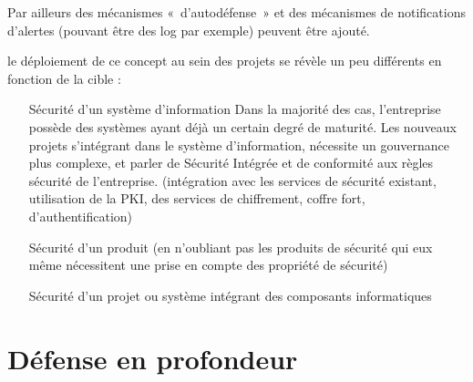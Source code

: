 Par ailleurs des mécanismes « d’autodéfense » et des mécanismes de notifications d’alertes (pouvant être des log par exemple) peuvent être ajouté.

le déploiement de ce concept au sein des projets  se révèle un peu différents en fonction de la cible :

\begin{itemize}
	\item  [Sécurité d’un système d’information] Dans la majorité des cas, l’entreprise possède des systèmes ayant déjà un certain degré de maturité. Les nouveaux projets s’intégrant dans le système d’information, nécessite un gouvernance plus complexe, et parler de Sécurité Intégrée et de conformité aux règles sécurité de l’entreprise. (intégration avec les services de sécurité existant, utilisation de la PKI, des services de chiffrement, coffre fort, d’authentification)
	\item [Sécurité d’un produit] (en n’oubliant pas les produits de sécurité qui eux même nécessitent une prise en compte des propriété de sécurité)
	\item [Sécurité d’un projet ou système intégrant des composants informatiques]
\end{itemize}

\section{Défense en profondeur}



